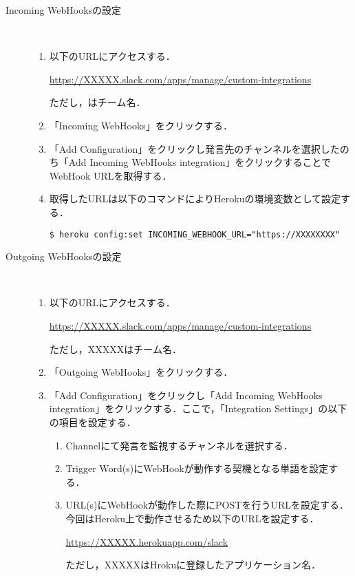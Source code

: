 \documentclass[fleqn, 14pt]{extarticlej}
\begin{document}
\begin{description}
\item[Incoming WebHooksの設定]\
  
  \begin{enumerate}
  \item 以下のURLにアクセスする．
    
    \url{https://XXXXX.slack.com/apps/manage/custom-integrations}

    ただし，はチーム名．
    
  \item 「Incoming WebHooks」をクリックする．
  \item 「Add Configuration」をクリックし発言先のチャンネルを選択したのち「Add Incoming WebHooks integration」をクリックすることでWebHook URLを取得する．
  \item 取得したURLは以下のコマンドによりHerokuの環境変数として設定する．

    \verb|$ heroku config:set INCOMING_WEBHOOK_URL="https://XXXXXXXX"| 
  \end{enumerate}
\item[Outgoing WebHooksの設定]\
  
  \begin{enumerate}
  \item 以下のURLにアクセスする．
    
    \url{https://XXXXX.slack.com/apps/manage/custom-integrations}

    ただし，XXXXXはチーム名．
    
  \item 「Outgoing WebHooks」をクリックする．
  \item 「Add Configuration」をクリックし「Add Incoming WebHooks integration」をクリックする．ここで，「Integration Settings」の以下の項目を設定する．
    \begin{enumerate}
    \item Channelにて発言を監視するチャンネルを選択する．
    \item Trigger Word(s)にWebHookが動作する契機となる単語を設定する．
    \item URL(s)にWebHookが動作した際にPOSTを行うURLを設定する．今回はHeroku上で動作させるため以下のURLを設定する．

      \url{https://XXXXX.herokuapp.com/slack}
      
      ただし，XXXXXはHrokuに登録したアプリケーション名．
    \end{enumerate}
  \end{enumerate}
\end{description}
\end{document}
